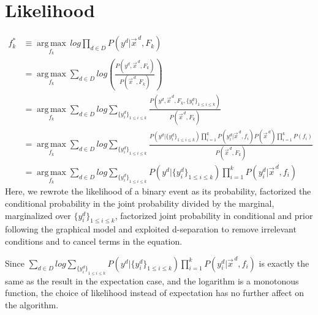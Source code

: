 \documentclass[11pt,a4paper]{article}
\begin{document}
\section{Likelihood}
\begin{align}
f_k^*&\equiv\operatorname*{arg\,max}_{f_k}\,log\prod_{d\in D}P\left(y^d|\vec{x}^{\,d},F_k\right)\nonumber\\
&=\operatorname*{arg\,max}_{f_k}\sum_{d\in D}log\left(\frac{P\left(y^d,\vec{x}^{\,d},F_k\right)}{P\left(\vec{x}^{\,d},F_k\right)}\right)\nonumber\\
&=\operatorname*{arg\,max}_{f_k}\sum_{d\in D}log\sum_{\{y_i^d\}_{1\leq i\leq k}}\frac{P\left(y^d,\vec{x}^{\,d}, F_k,\{y_i^d\}_{1\leq i\leq k}\right)}{P\left(\vec{x}^{\,d},F_k\right)}\nonumber\\
&=\operatorname*{arg\,max}_{f_k} \sum_{d \in D} log\sum_{{\{y_i^d\}}_{1\leq i \leq k}} \frac{P\left(y^d| \{y^d_i\}_{1 \leq i \leq k}\right) \prod_{i=1}^kP\left(y_i^d|\vec{x}^{\,d},f_i\right)P\left(\vec{x}^{\,d}\right)\prod_{i=1}^kP\left(f_i\right)}{P\left(\vec{x}^{\,d}, F_k\right)}\nonumber\\
&=\operatorname*{arg\,max}_{f_k}\sum_{d\in D}log\sum_{{\{y_i^d\}}_{1\leq i\leq k}}P\left(y^d|\{y^d_i\}_{1\leq i\leq k}\right)\prod_{i=1}^kP\left(y_i^d|\vec{x}^{\,d},f_i\right)\nonumber
\end{align}
Here, we rewrote the likelihood of a binary event as its probability, factorized the conditional probability in the joint probability divided by the marginal, marginalized over $\{y^d_i\}_{1\leq i\leq k}$, factorized joint probability in conditional and prior following the graphical model and exploited d-separation to remove irrelevant conditions and to cancel terms in the equation.

Since $\sum_{d\in D}log\sum_{{\{y_i^d\}}_{1\leq i\leq k}}P\left(y^d|\{y^d_i\}_{1\leq i\leq k}\right)\prod_{i=1}^kP\left(y_i^d|\vec{x}^{\,d},f_i\right)$ is exactly the same as the result in the expectation case, and the logarithm is a monotonous function, the choice of likelihood instead of expectation has no further affect on the algorithm.
\end{document}
